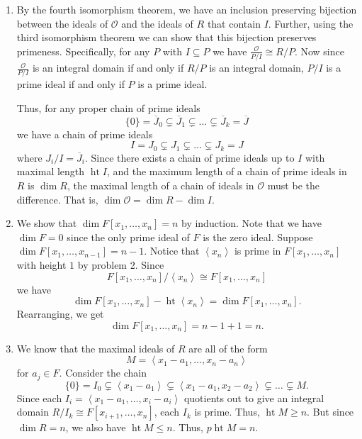 \documentclass[12 pt, letterpaper]{hmcpset}
\begin{document}
\begin{solution}
	\begin{enumerate}
		\item By the fourth isomorphism theorem, we have an inclusion preserving bijection between the ideals of $\mathcal{O}$ and the ideals of $R$ that contain $I$. Further, using the third isomorphism theorem we can show that this bijection preserves primeness. Specifically, for any $P$ with $I \subseteq P$ we have $\frac{\mathcal{O}}{P / I} \cong R / P$. Now since $\frac{\mathcal{O}}{P / I}$ is an integral domain if and only if $R / P$ is an integral domain, $P / I$ is a prime ideal if and only if $P$ is a prime ideal.

			Thus, for any proper chain of prime ideals
			\[
				\{ 0 \} = \overline{J}_{0} \subsetneq \overline{J}_{1} \subsetneq \dots \subsetneq \overline{J}_{k} = \overline{J}
			\]
			we have a chain of prime ideals
			\[
				I = J_{0} \subsetneq J_{1} \subsetneq \dots \subsetneq J_{k} = J
			\]
			where $J_{i} / I = \overline{J}_{i}$. Since there exists a chain of prime ideals up to $I$ with maximal length $\operatorname{ht} I$, and the maximum length of a chain of prime ideals in $R$ is $\dim R$, the maximal length of a chain of ideals in $\mathcal{O}$ must be the difference. That is, $\dim \mathcal{O} = \dim R - \dim I$.
		\item We show that $\dim F[x_{1}, \dots , x_{n}] = n$ by induction. Note that we have $\dim F = 0$ since the only prime ideal of $F$ is the zero ideal. Suppose $\dim F[x_{1}, \dots, x_{n - 1}] = n - 1$. Notice that $\left < x_{n} \right >$ is prime in $F[x_{1}, \dots, x_{n}]$ with height $1$ by problem 2. Since
			 \[
				F[x_{1}, \dots, x_{n}] / \left < x_{n} \right > \cong F[x_{1}, \dots, x_{n}]
			\]
			we have
			\[
				\dim F[x_{1}, \dots, x_{n}] - \operatorname{ht} \left < x_{n} \right > = \dim F[x_{1}, \dots, x_{n}].
			\]
			Rearranging, we get
			\[
				\dim F[x_{1}, \dots, x_{n}] = n - 1 + 1 = n.	
			\]
		\item We know that the maximal ideals of $R$ are all of the form
			\[
				M = \left < x_{1} - a_{1}, \dots, x_{n} - a_{n} \right >
			\]
			for $a_{j} \in F$. Consider the chain
			\[
				\{ 0 \} = I_{0} \subsetneq \left < x_{1} - a_{1} \right > \subsetneq \left < x_{1} - a_{1}, x_{2} - a_{2} \right > \subsetneq \dots \subsetneq M.
			\]
			Since each $I_{i} = \left < x_{1} - a_{1}, \dots, x_{i} - a_{i} \right >$ quotients out to give an integral domain $R / I_{k} \cong F[x_{i + 1}, \dots, x_{n}]$, each $I_{k}$ is prime. Thus, $\operatorname{ht} M \ge n$. But since $\dim R = n$, we also have $\operatorname{ht} M \le n$. Thus, $p\operatorname{ht} M = n$.
	\end{enumerate}
\end{solution}
\end{document}
